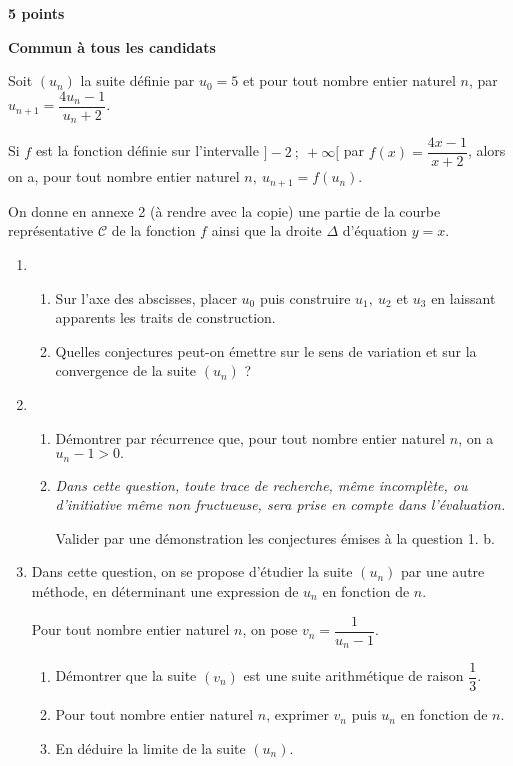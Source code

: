 \textbf{ \hfill 5 points}
 
\textbf{Commun à tous les candidats}

\medskip
 
Soit $\left(u_{n}\right)$ la suite définie par $u_{0} = 5$ et pour tout nombre entier naturel $n$, par  $u_{n+1} = \dfrac{4u_{n} - 1}{u_{n} +2}$.

\medskip
 
Si $f$ est la fonction définie sur l'intervalle $]- 2~;~+ \infty[$ par $f(x) = \dfrac{4x - 1}{x + 2}$, alors on a, pour tout nombre entier naturel $n,~ u_{n+1} = f\left(u_{n}\right)$.
 
On donne en annexe 2 (à rendre avec la copie) une partie de la courbe représentative $\mathcal{C}$ de la fonction $f$ ainsi que la droite $\Delta$ d'équation $y = x$.
 
\begin{enumerate}
\item 
	\begin{enumerate}
		\item Sur l'axe des abscisses, placer $u_{0}$ puis construire $u_{1},~ u_{2}$ et $u_{3}$ en laissant apparents les traits de construction. 
		\item Quelles conjectures peut-on émettre sur le sens de variation et sur la convergence de la suite $\left(u_{n}\right)$ ?
	\end{enumerate} 
\item
	\begin{enumerate}
		\item Démontrer par récurrence que, pour tout nombre entier naturel $n$, on a $u_{n} - 1 > 0.$
		\item \emph{Dans cette question, toute trace de recherche, même incomplète, ou d'initiative même non fructueuse, sera prise en compte dans l'évaluation.}
		 
Valider par une démonstration les conjectures émises à la question 1. b.
	\end{enumerate} 
\item Dans cette question, on se propose d'étudier la suite $\left(u_{n}\right)$ par une autre méthode, en déterminant une expression de $u_{n}$ en fonction de $n$.
 
Pour tout nombre entier naturel $n$, on pose $v_{n} = \dfrac{1}{u_{n} - 1}$. 
	\begin{enumerate}
		\item Démontrer que la suite $\left(v_{n}\right)$ est une suite arithmétique de raison $\dfrac{1}{3}$. 
		\item  Pour tout nombre entier naturel $n$, exprimer $v_{n}$ puis $u_{n}$ en fonction de $n$. 
		\item  En déduire la limite de la suite $\left(u_{n}\right)$. 
	\end{enumerate}
\end{enumerate}

